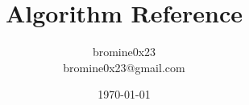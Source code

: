 \title{\Huge Algorithm Reference}
\author{\ttfamily\huge bromine0x23\\\ttfamily\small bromine0x23@gmail.com}
\date{\ttfamily\today}
\maketitle